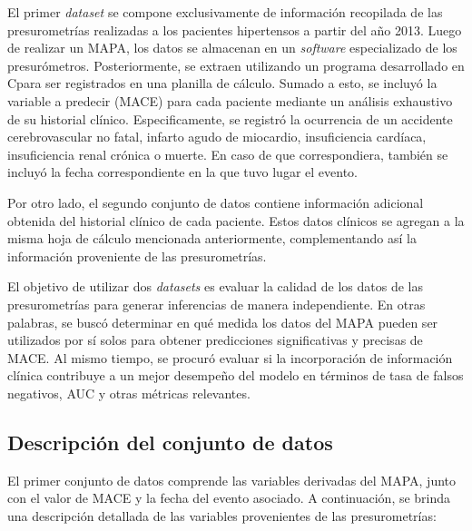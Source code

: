 El primer \emph{dataset} se compone exclusivamente de información recopilada de las 
presurometrías realizadas a los pacientes hipertensos a partir del año 2013. Luego 
de realizar un MAPA, los datos se almacenan en un \emph{software} especializado de 
los presurómetros. Posteriormente, se extraen utilizando un programa desarrollado 
en C\myhash para ser registrados en una planilla de cálculo. Sumado a esto, se incluyó 
la variable a predecir (MACE) para cada paciente mediante un análisis exhaustivo 
de su historial clínico. Especificamente, se registró la ocurrencia de 
un accidente cerebrovascular no fatal, infarto agudo de miocardio, insuficiencia 
cardíaca, insuficiencia renal crónica o muerte. En caso de que correspondiera, también 
se incluyó la fecha correspondiente en la que tuvo lugar el evento.

Por otro lado, el segundo conjunto de datos contiene información adicional obtenida 
del historial clínico de cada paciente. Estos datos clínicos se agregan a la misma 
hoja de cálculo mencionada anteriormente, complementando así la información proveniente 
de las presurometrías.

El objetivo de utilizar dos \emph{datasets} es evaluar la calidad de los datos de 
las presurometrías para generar inferencias de manera independiente. En otras palabras, 
se buscó determinar en qué medida los datos del MAPA pueden ser utilizados por sí solos 
para obtener predicciones significativas y precisas de MACE. Al mismo tiempo, se procuró 
evaluar si la incorporación de información clínica contribuye a un mejor desempeño del 
modelo en términos de tasa de falsos negativos, AUC y otras métricas relevantes.



\subsection{Descripción del conjunto de datos}

El primer conjunto de datos comprende las variables derivadas del MAPA, junto con 
el valor de MACE y la fecha del evento asociado. A continuación, se brinda una 
descripción detallada de las variables provenientes de las presurometrías: 

